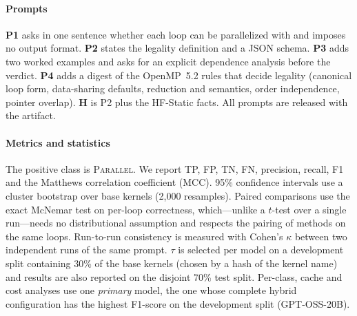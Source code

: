 \paragraph{Prompts} \textbf{P1} asks in one sentence whether each loop can be parallelized with  and imposes no output format. \textbf{P2} states the legality definition and a JSON schema. \textbf{P3} adds two worked examples and asks for an explicit dependence analysis before the verdict. \textbf{P4} adds a digest of the OpenMP~5.2 rules that decide legality (canonical loop form, data-sharing defaults, reduction and  semantics, order independence, pointer overlap). \textbf{H} is P2 plus the HF-Static facts. All prompts are released with the artifact.

\paragraph{Metrics and statistics} The positive class is \textsc{Parallel}. We report TP, FP, TN, FN, precision, recall, F1 and the Matthews correlation coefficient (MCC). 95\% confidence intervals use a cluster bootstrap over base kernels (2{,}000 resamples). Paired comparisons use the exact McNemar test on per-loop correctness, which---unlike a $t$-test over a single run---needs no distributional assumption and respects the pairing of methods on the same loops. Run-to-run consistency is measured with Cohen's $\kappa$ between two independent runs of the same prompt. $\tau$ is selected per model on a development split containing 30\% of the base kernels (chosen by a hash of the kernel name) and results are also reported on the disjoint 70\% test split. Per-class, cache and cost analyses use one \emph{primary} model, the one whose complete hybrid configuration has the highest F1-score on the development split (GPT-OSS-20B).
